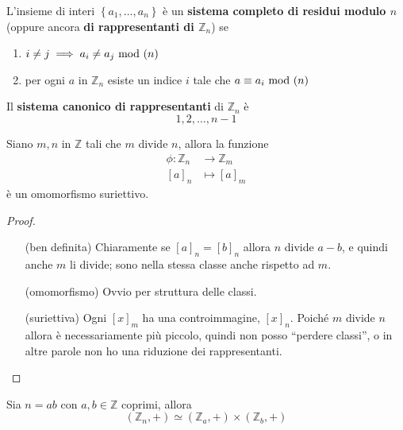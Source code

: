 \begin{definizione}
	L'insieme di interi $\left\{a_1,\dots,a_n\right\}$ è un \textbf{sistema completo di residui modulo $n$} (oppure ancora \textbf{di rappresentanti di $\mathbb{Z}_n$}) se
	\begin{enumerate}
		\item $i\neq j \implies a_i\neq a_j \ \mathrm{mod}\ (n)$%
		\item per ogni $a$ in $\mathbb{Z}_n$ esiste un indice $i$ tale che $a\equiv a_i \ \mathrm{mod}\ (n)$
	\end{enumerate}
Il \textbf{sistema canonico di rappresentanti} di $\mathbb{Z}_n$ è
\begin{equation*}
1,2,\dots,n-1
\end{equation*}
\end{definizione}
\begin{proposizione}
	Siano $m,n$ in $\mathbb{Z}$ tali che $m$ divide $n$, allora la funzione
	\begin{align*}
	\phi:\mathbb{Z}_n&\longrightarrow\mathbb{Z}_m\\
	[a]_n&\longmapsto[a]_m
	\end{align*}
	è un omomorfismo suriettivo.
\end{proposizione}
\begin{proof}\
	\begin{itemize}
		\item[(ben definita)] Chiaramente se $[a]_n=[b]_n$ allora $n$ divide $a-b$, e quindi anche $m$ li divide; sono nella stessa classe anche rispetto ad $m$.
		\item[(omomorfismo)] Ovvio per struttura delle classi.
		\item[(suriettiva)] Ogni $[x]_m$ ha una controimmagine, $[x]_n$. Poiché $m$ divide $n$ allora è necessariamente più piccolo, quindi non posso \enquote{perdere classi}, o in altre parole non ho una riduzione dei rappresentanti. 
	\end{itemize}
\end{proof}
\begin{proposizione}
	Sia $n=ab$ con $a,b\in\mathbb{Z}$ coprimi, allora 
	\begin{equation*}
	(\mathbb{Z}_n,+)\simeq(\mathbb{Z}_a,+)\times(\mathbb{Z}_b,+)
	\end{equation*}
\end{proposizione}
